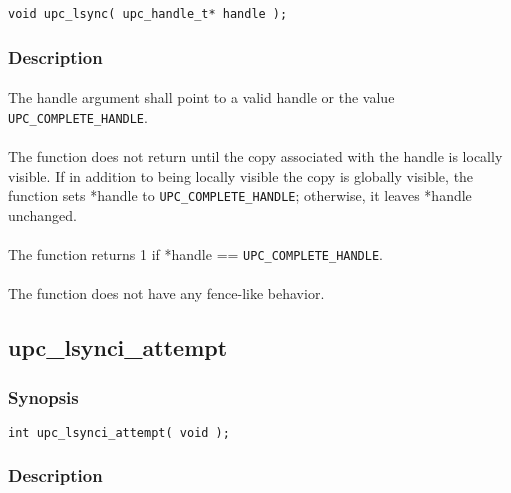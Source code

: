 \documentclass[10pt]{article}
\def \complete {{\tt UPC\_COMPLETE\_HANDLE}}
\begin{document}
\begin{verbatim}
void upc_lsync( upc_handle_t* handle );
\end{verbatim}

\subsubsection{Description}

\paragraph{} The handle argument shall point to a valid handle or the value
\complete{}.

\paragraph{} The \function{} function does not return until the copy associated
with the handle is locally visible.  If in addition to being locally visible the
copy is globally visible, the \function{} function sets *handle to \complete{};
otherwise, it leaves *handle unchanged.

\paragraph{} The \function{} function returns 1 if *handle == \complete{}.

\paragraph{} The \function{} function does not have any fence-like behavior.

\newpage
\subsection{upc\_lsynci\_attempt}
\def\function{{\tt upc\_lsynci\_attempt}}

\subsubsection{Synopsis}

\begin{verbatim}
int upc_lsynci_attempt( void );
\end{verbatim}

\subsubsection{Description}
\end{document}

